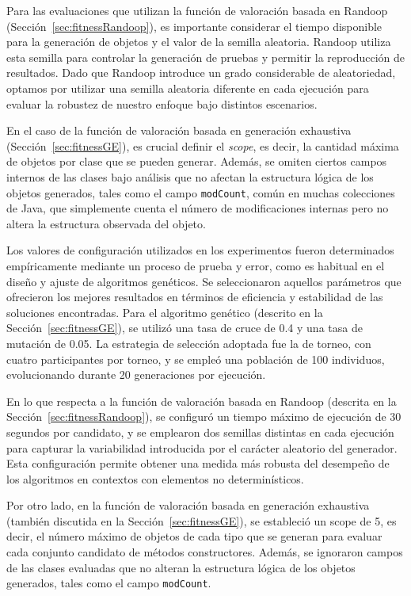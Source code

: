 Para las evaluaciones que utilizan la función de valoración basada en Randoop
(Sección~\ref{sec:fitnessRandoop}), es importante considerar el tiempo
disponible para la generación de objetos y el valor de la semilla aleatoria.
Randoop utiliza esta semilla para controlar la generación de pruebas y
permitir la reproducción de resultados. Dado que Randoop introduce un grado
considerable de aleatoriedad, optamos por utilizar una semilla aleatoria
diferente en cada ejecución para evaluar la robustez de nuestro enfoque bajo
distintos escenarios.

En el caso de la función de valoración basada en generación exhaustiva
(Sección~\ref{sec:fitnessGE}), es crucial definir el \emph{scope}, es decir, la
cantidad máxima de objetos por clase que se pueden generar. Además, se omiten
ciertos campos internos de las clases bajo análisis que no afectan la
estructura lógica de los objetos generados, tales como el campo
\texttt{modCount}, común en muchas colecciones de Java, que simplemente cuenta
el número de modificaciones internas pero no altera la estructura observada
del objeto.

Los valores de configuración utilizados en los experimentos fueron determinados empíricamente mediante un proceso de prueba y error,
como es habitual en el diseño y ajuste de algoritmos genéticos. 
Se seleccionaron aquellos parámetros que ofrecieron los mejores resultados en términos de eficiencia y estabilidad de las soluciones encontradas. 
Para el algoritmo genético (descrito en la Sección~\ref{sec:fitnessGE}), se utilizó una tasa de cruce de 0.4 y una tasa de mutación de 0.05. 
La estrategia de selección adoptada fue la de torneo, con cuatro participantes por torneo, y se empleó una población de 100 individuos, 
evolucionando durante 20 generaciones por ejecución.

En lo que respecta a la función de valoración basada en Randoop (descrita en la Sección~\ref{sec:fitnessRandoop}),
se configuró un tiempo máximo de ejecución de 30 segundos por candidato, 
y se emplearon dos semillas distintas en cada ejecución para capturar la variabilidad introducida por 
el carácter aleatorio del generador. Esta configuración permite obtener una medida más robusta del desempeño 
de los algoritmos en contextos con elementos no determinísticos.

Por otro lado, en la función de valoración basada en generación exhaustiva (también discutida en la Sección~\ref{sec:fitnessGE}), 
se estableció un scope de 5, es decir, el número máximo de objetos de cada tipo que se generan para evaluar cada conjunto candidato de métodos
constructores. Además, se ignoraron campos de las clases evaluadas que no alteran la estructura lógica de los objetos generados, tales como el campo \texttt{modCount}.

